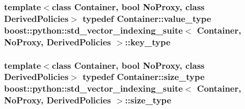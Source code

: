 \hypertarget{classboost_1_1python_1_1std__vector__indexing__suite_aad8e15443d4d920d6b15e1781fba568a}{
\subsubsection[{key\-\_\-type}]{\setlength{\rightskip}{0pt plus 5cm}template$<$class Container, bool No\-Proxy, class Derived\-Policies$>$ typedef Container\-::value\-\_\-type {\bf boost\-::python\-::std\-\_\-vector\-\_\-indexing\-\_\-suite}$<$ Container, No\-Proxy, Derived\-Policies $>$\-::{\bf key\-\_\-type}}}\label{classboost_1_1python_1_1std__vector__indexing__suite_aad8e15443d4d920d6b15e1781fba568a}
\hypertarget{classboost_1_1python_1_1std__vector__indexing__suite_af582d879611acb090b6d227a64914cc6}{
\subsubsection[{size\-\_\-type}]{\setlength{\rightskip}{0pt plus 5cm}template$<$class Container, bool No\-Proxy, class Derived\-Policies$>$ typedef Container\-::size\-\_\-type {\bf boost\-::python\-::std\-\_\-vector\-\_\-indexing\-\_\-suite}$<$ Container, No\-Proxy, Derived\-Policies $>$\-::{\bf size\-\_\-type}}}\label{classboost_1_1python_1_1std__vector__indexing__suite_af582d879611acb090b6d227a64914cc6}


